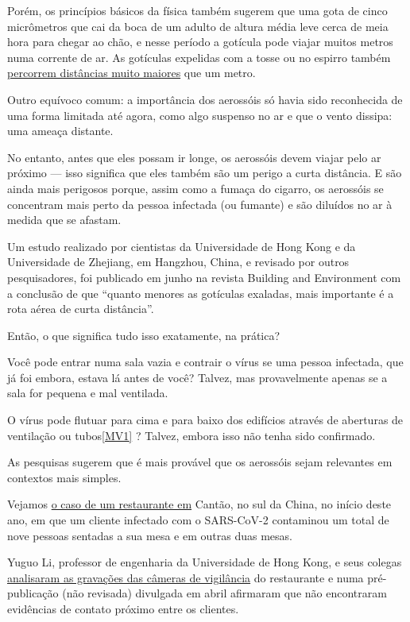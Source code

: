 Porém, os princípios básicos da física também sugerem que uma gota de
cinco micrômetros que cai da boca de um adulto de altura média leve
cerca de meia hora para chegar ao chão, e nesse período a gotícula pode
viajar muitos metros numa corrente de ar. As gotículas expelidas com a
tosse ou no espirro também
\href{https://academic.oup.com/jid/advance-article/doi/10.1093/infdis/jiaa189/5820886}{percorrem
distâncias muito maiores} que um metro.

Outro equívoco comum: a importância dos aerossóis só havia sido
reconhecida de uma forma limitada até agora, como algo suspenso no ar e
que o vento dissipa: uma ameaça distante.

No entanto, antes que eles possam ir longe, os aerossóis devem viajar
pelo ar próximo --- isso significa que eles também são um perigo a curta
distância. E são ainda mais perigosos porque, assim como a fumaça do
cigarro, os aerossóis se concentram mais perto da pessoa infectada (ou
fumante) e são diluídos no ar à medida que se afastam.

Um estudo realizado por cientistas da Universidade de Hong Kong e da
Universidade de Zhejiang, em Hangzhou, China, e revisado por outros
pesquisadores, foi publicado em junho na revista Building and
Environment com a conclusão de que ``quanto menores as gotículas
exaladas, mais importante é a rota aérea de curta distância''.

Então, o que significa tudo isso exatamente, na prática?

Você pode entrar numa sala vazia e contrair o vírus se uma pessoa
infectada, que já foi embora, estava lá antes de você? Talvez, mas
provavelmente apenas se a sala for pequena e mal ventilada.

O vírus pode flutuar para cima e para baixo dos edifícios através de
aberturas de ventilação ou tubos\protect\hyperlink{_msocom_1}{{[}MV1{]}}
? Talvez, embora isso não tenha sido confirmado.

As pesquisas sugerem que é mais provável que os aerossóis sejam
relevantes em contextos mais simples.

Vejamos
\href{https://www.nytimes.com/2020/04/20/health/airflow-coronavirus-restaurants.html}{o
caso de um restaurante em} Cantão, no sul da China, no início deste ano,
em que um cliente infectado com o SARS-CoV-2 contaminou um total de nove
pessoas sentadas a sua mesa e em outras duas mesas.

Yuguo Li, professor de engenharia da Universidade de Hong Kong, e seus
colegas
\href{https://www.medrxiv.org/content/10.1101/2020.04.16.20067728v1}{analisaram
as gravações das câmeras de vigilância} do restaurante e numa
pré-publicação (não revisada) divulgada em abril afirmaram que não
encontraram evidências de contato próximo entre os clientes.

